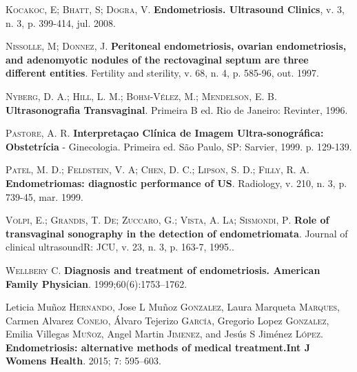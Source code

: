 \documentclass[12pt]{article} %
\begin{document}
\textsc{Kocakoc, E; Bhatt, S; Dogra, V}.\textbf{ Endometriosis. Ultrasound Clinics}, v. 3, n. 3, p. 399-414, jul. 2008.

\vspace{0,5cm}

\textsc{Nissolle, M; Donnez, J}.\textbf{ Peritoneal endometriosis, ovarian endometriosis, and adenomyotic nodules of the rectovaginal septum are three different entities}. Fertility and sterility, v. 68, n. 4, p. 585-96, out. 1997.

\vspace{0,5cm}

\textsc{Nyberg, D. A.; Hill, L. M.; Bohm-Vélez, M.; Mendelson, E. B}.\textbf{ Ultrasonografia Transvaginal}. Primeira B ed. Rio de Janeiro: Revinter, 1996.

\vspace{0,5cm}

\textsc{Pastore, A. R}.\textbf{ Interpretaçao Clínica de Imagem Ultra-sonográfica: Obstetrícia} - Ginecologia. Primeira ed. São Paulo, SP: Sarvier, 1999. p. 129-139.

\vspace{0,5cm}

\textsc{Patel, M. D.; Feldstein, V. A; Chen, D. C.; Lipson, S. D.; Filly, R. A}. \textbf{Endometriomas: diagnostic performance of US}. Radiology, v. 210, n. 3, p. 739-45, mar. 1999.

\vspace{0,5cm}

\textsc{Volpi, E.; Grandis, T. De; Zuccaro, G.; Vista, A. La; Sismondi, P}.\textbf{ Role of transvaginal sonography in the detection of endometriomata}. Journal of clinical ultrasoundR: JCU, v. 23, n. 3, p. 163-7, 1995..  

\vspace{0,5cm}

\textsc{Wellbery C}.\textbf{ Diagnosis and treatment of endometriosis. American Family Physician}. 1999;60(6):1753–1762.

\vspace{0,5cm}

Leticia Muñoz \textsc{Hernando}, Jose L Muñoz \textsc{Gonzalez}, Laura Marqueta \textsc{Marques}, Carmen Alvarez \textsc{Conejo}, Álvaro Tejerizo \textsc{García}, Gregorio Lopez \textsc{Gonzalez}, Emilia Villegas \textsc{Muñoz}, Angel Martin \textsc{Jimenez}, and Jesús S Jiménez \textsc{López}. \textbf{Endometriosis: alternative methods of medical treatment.Int J Womens Health}. 2015; 7: 595–603. 
\end{document}
